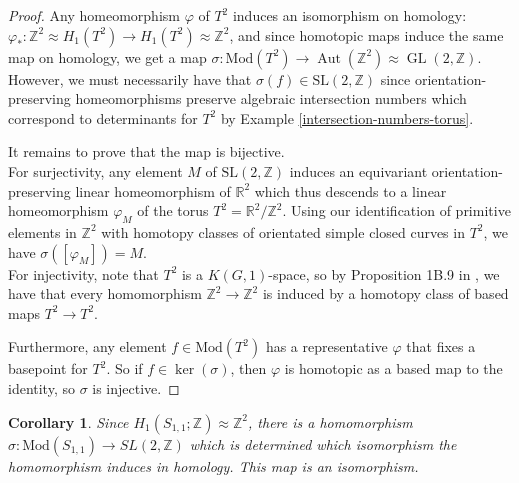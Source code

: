 \documentclass[reqno]{amsart}
\newtheorem{corollary}[theorem]{Corollary}
\theoremstyle{definition}
\theoremstyle{remark}
\DeclareMathOperator{\Aut}{Aut}
\DeclareMathOperator{\GL}{GL}
\newcommand{\SL}{{\mathrm{SL}}}
\newcommand{\Mod}{{\mathrm{Mod}}}
\begin{document}
\begin{proof}
    Any homeomorphism $\varphi $ of $T^2$ induces
    an isomorphism on homology: $\varphi_* \colon
    \mathbb{Z}^2 \approx H_1 (T^2) \to H_1\left( T^2 \right) 
    \approx \mathbb{Z}^2$, and
    since homotopic maps induce
    the same map on homology,
    we get a map
    $\sigma \colon \Mod \left( T^2 \right) 
    \to \Aut\left( \mathbb{Z}^2 \right) 
    \approx
    \GL \left( 2,\mathbb{Z} \right) $.
    However, we must necessarily have that
    $\sigma (f) \in \SL(2,\mathbb{Z})$ since
    orientation-preserving homeomorphisms
    preserve algebraic intersection numbers
    which correspond to determinants 
    for $T^2$ by Example \ref{intersection-numbers-torus}.
    
    It remains to prove that the map is bijective.\\
    

    For surjectivity, any element $M$ of
    $\SL \left( 2,\mathbb{Z} \right) $ induces
    an equivariant orientation-preserving linear homeomorphism
    of $\mathbb{R}^2$ which thus descends
    to a linear homeomorphism
    $\varphi_{M}$ of the torus $T^2 = \mathbb{R}^2
    / \mathbb{Z}^2$. Using our identification
    of primitive elements in $\mathbb{Z}^2$ with
    homotopy classes of orientated simple closed
    curves in $T^2$, we have
    $\sigma \left( \left[ \varphi_M \right]  \right) =M$.\\
    

    For injectivity, note that
    $T^2$ is a $K\left( G,1 \right) $-space, so
    by Proposition 1B.9 in \cite{Hatcher}, we have
    that every homomorphism
    $ \mathbb{Z}^2 \to \mathbb{Z}^2 $ is induced by
    a homotopy class of based maps
    $T^2 \to T^2$.

    Furthermore, any element $f \in \Mod \left( T^2 \right) $ 
    has a representative $\varphi $ that fixes a basepoint
    for $T^2$. So if $f \in \ker \left( \sigma \right) $, then
    $\varphi $ is homotopic as a based map to
    the identity, so $\sigma$ is injective. 

\end{proof}

\begin{corollary}
    Since $H_1 \left( S_{1,1}; \mathbb{Z} \right) \approx
    \mathbb{Z}^2$, there is a homomorphism
    $\sigma \colon \Mod \left( S_{1,1} \right) \to 
    SL(2, \mathbb{Z})$ which is determined
    which isomorphism the homomorphism induces in
    homology. This map is an isomorphism.
\end{corollary}
\end{document}

